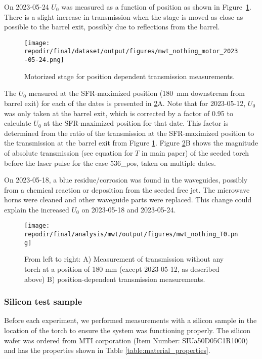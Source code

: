On 2023-05-24 $U_{0}$ was measured as a function of position as shown in Figure\ \ref{fig:SI_MWT_nothing_motor}. There is a slight increase in transmission when the stage is moved as close as possible to the barrel exit, possibly due to reflections from the barrel.


\begin{figure}
\centering
\texttt{[image: \\repodir/final/dataset/output/figures/mwt\_nothing\_motor\_2023-05-24.png]}
\caption{Motorized stage for position dependent transmission measurements.}
\label{fig:SI_MWT_nothing_motor}
\end{figure}


The $U_{0}$ measured at the SFR-maximized position (\SI{180}{\milli\meter} downstream from barrel exit) for each of the dates is presented in \ref{fig:SI_MWT_nothing_T0}A. Note that for 2023-05-12, $U_{0}$ was only taken at the barrel exit, which is corrected by a factor of 0.95 to calculate $U_{0}$ at the SFR-maximized position for that date. This factor is determined from the ratio of the transmission at the SFR-maximized position to the transmission at the barrel exit from Figure \ref{fig:SI_MWT_nothing_motor}. Figure \ref{fig:SI_MWT_nothing_T0}B shows the magnitude of absolute transmission (see equation for $T$ in main paper) of the seeded torch before the laser pulse for the case 536\_pos, taken on multiple dates. 

On 2023-05-18, a blue residue/corrosion was found in the waveguides, possibly from a chemical reaction or deposition from the seeded free jet. The microwave horns were cleaned and other waveguide parts were replaced. This change could explain the increased $U_{0}$ on 2023-05-18 and 2023-05-24.



\begin{figure}[]
\centering
\texttt{[image: \\repodir/final/analysis/mwt/output/figures/mwt\_nothing\_T0.png]}
\caption{ From left to right: A) Measurement of transmission without any torch at a position of 180 mm (except 2023-05-12, as described above) B) position-dependent transmission measurements.}
\label{fig:SI_MWT_nothing_T0}
\end{figure}

\subsubsection{Silicon test sample}

Before each experiment, we performed measurements with a silicon sample in the location of the torch to ensure the system was functioning properly. The silicon wafer was ordered from MTI corporation (Item Number: SIUa50D05C1R1000) and has the properties shown in Table \ref{table:material_properties}.

